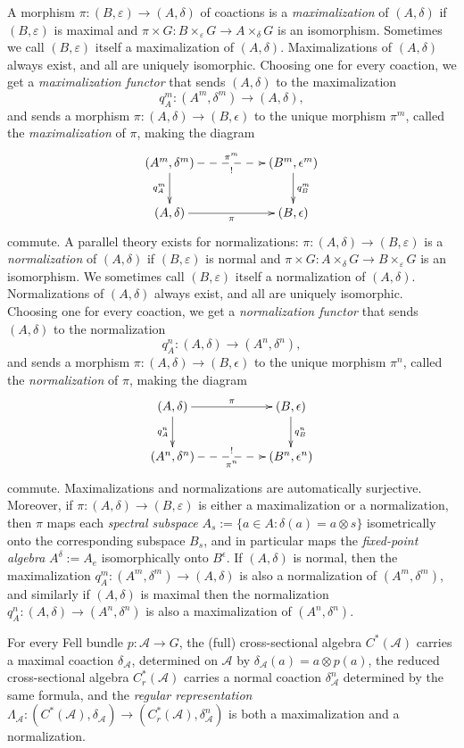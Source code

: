 \documentclass[12pt]{amsart}
\theoremstyle{plain}
\theoremstyle{remark}
\theoremstyle{definition}
\numberwithin{equation}{section}
\theoremstyle{plain}
\theoremstyle{definition}
\theoremstyle{remark}
\begin{document}
A morphism $\pi:(B,\varepsilon)\to (A,\delta)$ of coactions is a \emph{maximalization} of $(A,\delta)$ if $(B,\varepsilon)$ is maximal and $\pi\times G:B\times_\varepsilon G\to A\times_\delta G$ is an isomorphism.
Sometimes we call $(B,\varepsilon)$ itself a maximalization of $(A,\delta)$.
Maximalizations of $(A,\delta)$ always exist, and all are uniquely isomorphic.
Choosing one for every coaction, we get a \emph{maximalization functor} that sends $(A,\delta)$ to the maximalization
\[
q_A^m:(A^m,\delta^m)\to (A,\delta),
\]
and sends a morphism $\pi:(A,\delta)\to (B,\epsilon)$ to the unique morphism $\pi^m$, called the \emph{maximalization} of $\pi$, making the diagram
\[
\xymatrix@C+30pt{
(A^m,\delta^m) \ar@{-->}[r]^-{\pi^m}_-{!} \ar[d]_{q_A^m}
&(B^m,\epsilon^m) \ar[d]^{q_B^m}
\\
(A,\delta) \ar[r]_-\pi
&(B,\epsilon)
}
\]
commute.
A parallel theory exists for normalizations:
$\pi:(A,\delta)\to (B,\varepsilon)$ is a \emph{normalization} of $(A,\delta)$ if $(B,\varepsilon)$ is normal and $\pi\times G:A\times_\delta G\to B\times_\varepsilon G$ is an isomorphism.
We sometimes call $(B,\varepsilon)$ itself a normalization of $(A,\delta)$.
Normalizations of $(A,\delta)$ always exist, and all are uniquely isomorphic.
Choosing one for every coaction, we get a \emph{normalization functor} that sends $(A,\delta)$ to the normalization
\[
q_A^n:(A,\delta)\to (A^n,\delta^n),
\]
and sends a morphism $\pi:(A,\delta)\to (B,\epsilon)$ to the unique morphism $\pi^n$, called the \emph{normalization} of $\pi$, making the diagram
\[
\xymatrix@C+30pt{
(A,\delta) \ar[r]^-\pi \ar[d]_{q_A^n}
&(B,\epsilon) \ar[d]^{q_B^n}
\\
(A^n,\delta^n) \ar@{-->}[r]_-{\pi^n}^-{!}
&(B^n,\epsilon^n)
}
\]
commute.
Maximalizations and normalizations are automatically surjective.
Moreover, if $\pi:(A,\delta)\to (B,\varepsilon)$ is either a maximalization or a normalization, then $\pi$ maps each \emph{spectral subspace} $A_s:=\{a\in A:\delta(a)=a\otimes s\}$ isometrically onto the corresponding subspace $B_s$, and in particular maps the \emph{fixed-point algebra} $A^\delta:=A_e$ isomorphically onto $B^\epsilon$.
If $(A,\delta)$ is normal, then the maximalization $q_A^m:(A^m,\delta^m)\to (A,\delta)$ is also a normalization of $(A^m,\delta^m)$,
and similarly if $(A,\delta)$ is maximal then the normalization $q_A^n:(A,\delta)\to (A^n,\delta^n)$ is also a maximalization of $(A^n,\delta^n)$.

For every Fell bundle $p:{\mathcal A}\to G$, the (full) cross-sectional algebra $C^*({\mathcal A})$ carries a maximal coaction $\delta_{\mathcal A}$, determined on ${\mathcal A}$ by $\delta_{\mathcal A}(a)=a\otimes p(a)$,
the reduced cross-sectional algebra $C^*_r({\mathcal A})$ carries a normal coaction $\delta_{\mathcal A}^n$ determined by the same formula,
and the \emph{regular representation} $\Lambda_{\mathcal A}:(C^*({\mathcal A}),\delta_{\mathcal A})\to (C^*_r({\mathcal A}),\delta_{\mathcal A}^n)$ is both a maximalization and a normalization.
\end{document}
